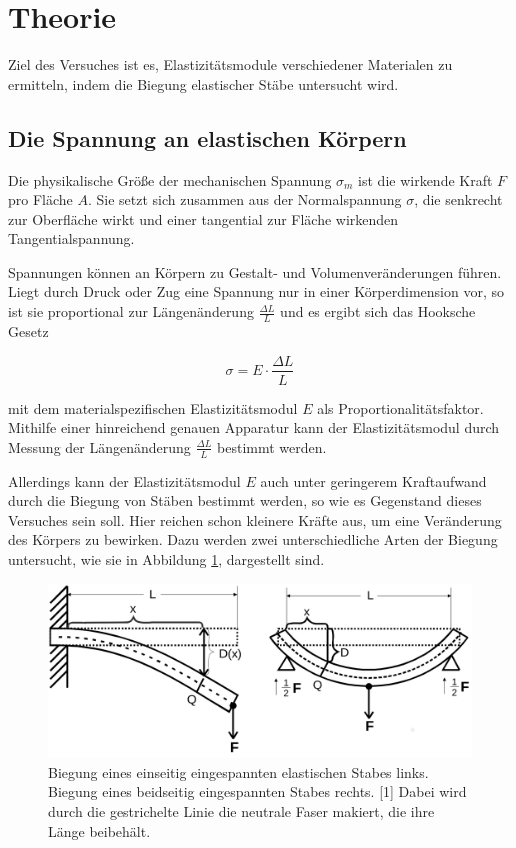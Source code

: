\section{Theorie}
\label{sec:Theorie}

Ziel des Versuches ist es, Elastizitätsmodule verschiedener Materialen
zu ermitteln, indem die Biegung elastischer Stäbe untersucht wird.

\subsection{Die Spannung an elastischen Körpern}

Die physikalische Größe der mechanischen Spannung $\sigma_m$ ist die wirkende
Kraft $F$ pro Fläche $A$. Sie setzt sich zusammen aus der Normalspannung $\sigma$,
die senkrecht zur Oberfläche wirkt und einer tangential zur Fläche wirkenden
Tangentialspannung.

Spannungen können an Körpern zu Gestalt- und Volumenveränderungen
führen. Liegt durch Druck oder Zug eine Spannung nur in einer Körperdimension vor, 
so ist sie proportional zur Längenänderung $\frac{\Delta L}{L}$ und es ergibt sich
das Hooksche Gesetz

\begin{equation*}
    \sigma = E \cdot \frac{\Delta L}{L}
\end{equation*}

mit dem materialspezifischen Elastizitätsmodul $E$ als Proportionalitätsfaktor.
Mithilfe einer hinreichend genauen Apparatur kann der Elastizitätsmodul durch
Messung der Längenänderung $\frac{\Delta L}{L}$ bestimmt werden.

Allerdings kann der Elastizitätsmodul $E$ auch unter geringerem Kraftaufwand
durch die Biegung von Stäben bestimmt werden, so wie es Gegenstand dieses
Versuches sein soll. Hier reichen schon kleinere Kräfte aus, um eine Veränderung 
des Körpers zu bewirken. Dazu werden zwei unterschiedliche Arten der Biegung
untersucht, wie sie in Abbildung \ref{fig:abb1}, dargestellt sind.

\begin{figure}
    \centering
    \includegraphics[scale=0.2]{content/Biegungen.png}
    \caption{Biegung eines einseitig eingespannten elastischen Stabes links.\newline
    Biegung eines beidseitig eingespannten Stabes rechts. [1]\newline
    Dabei wird durch die gestrichelte Linie die neutrale Faser makiert, die ihre Länge beibehält.}
    \label{fig:abb1}
\end{figure}

